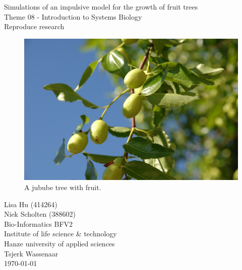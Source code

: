 \begin{center}


\Huge{Simulations of an impulsive model for the growth of fruit trees}\\
\vspace{\baselineskip}
\LARGE{Theme 08 - Introduction to Systems Biology}\\
\large{Reproduce research}\\
\vspace{\baselineskip}

\begin{figure}
  \centering\includegraphics[width=\linewidth]{jujube}
  \caption{A jubube tree with fruit.}
  \label{fig:jujube}
\end{figure}

\end{center}
\vspace{\baselineskip}

\normalsize
\vspace*{\fill}
\begin{flushright}
Lisa Hu (414264)\\
Niek Scholten (388602)\\
Bio-Informatics BFV2\\
Institute of life science \& technology\\
Hanze university of applied sciences\\
Tsjerk Wassenaar\\
\today
\end{flushright}
\newpage

\null
\thispagestyle{empty}
\addtocounter{page}{-1}
\newpage

